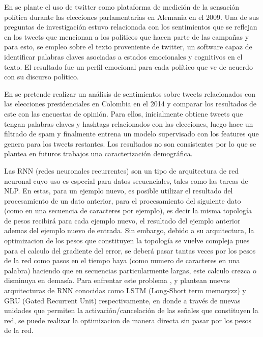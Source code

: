 En \cite{tumasjan2010predicting} se plante el uso de twitter como plataforma de medición de la sensación política durante las elecciones parlamentarias en Alemania en el 2009. Una de sus preguntas de investigación estuvo relacionada con los sentimientos que se reflejan en los tweets que mencionan a los políticos que hacen parte de las campañas y para esto, se empleo sobre el texto proveniente de twitter, un software capaz de identificar palabras claves asociadas a estados emocionales y cognitivos en el texto. El resultado fue un perfil emocional para cada político que ve de acuerdo con su discurso político.

En \cite{ceron2016sentiment} se pretende realizar un análisis de sentimientos sobre tweets relacionados con las elecciones presidenciales en Colombia en el 2014 y comparar los resultados de este con las encuestas de opinión. Para ellos, inicialmente obtiene tweets que tengan  palabras claves y hashtags relacionados con las elecciones, luego hace un filtrado de spam y finalmente entrena un modelo supervisado con los features que genera para los tweets restantes. Los resultados no son consistentes por lo que se plantea en futuros trabajos  una caracterización demográfica.



Las RNN (redes neuronales recurrentes) son un tipo de arquitectura de red neuronal cuyo uso es especial para datos secuenciales, tales como las tareas de NLP. En estas, para un ejemplo nuevo, es posible utilizar el resultado del procesamiento de un dato anterior, para el procesamiento del siguiente dato (como en una secuencia de caracteres por ejemplo), es decir la misma topología de pesos recibirá para cada ejemplo nuevo, el resultado del ejemplo anterior ademas del ejemplo nuevo de entrada. Sin embargo, debido a su arquitectura, la optimizacion de los pesos que constituyen la topología se vuelve compleja pues para el calculo del gradiente del error, se deberá pasar tantas veces por los pesos de la red como pasos en el tiempo haya (como numero de caracteres en una palabra) haciendo que en secuencias particularmente largas, este calculo crezca o disminuya en demasía. Para enfrentar este problema , \cite{hochreiter1997long} y \cite{chung2014empirical} plantean nuevas arquitecturas de RNN conocidas como LSTM (Long-Short term memoryzz) y GRU (Gated Recurrent Unit) respectivamente, en donde a través de nuevas unidades que permiten la activación/cancelación de las señales que constituyen la red, se puede realizar la optimizacion de manera directa sin pasar por los pesos de la red.


